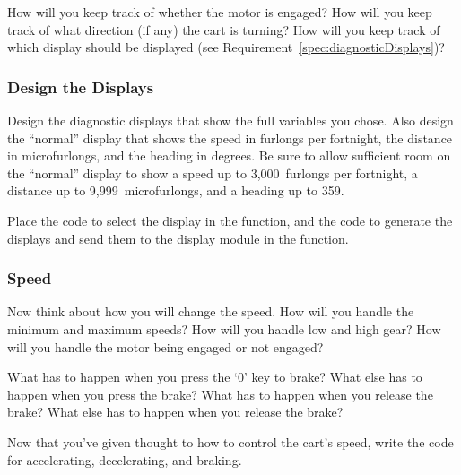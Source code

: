 How will you keep track of whether the motor is engaged?
How will you keep track of what direction (if any) the cart is turning?
How will you keep track of which display should be displayed (see Requirement~\ref{spec:diagnosticDisplays})?

\subsubsection{Design the Displays}

Design the diagnostic displays that show the full variables you chose.
Also design the ``normal'' display that shows the speed in furlongs per fortnight, the distance in microfurlongs, and the heading in degrees.
Be sure to allow sufficient room on the ``normal'' display to show a speed up to 3,000~furlongs per fortnight, a distance up to 9,999~microfurlongs, and a heading up to 359\textdegree.

Place the code to select the display in the  function, and the code to generate the displays and send them to the display module in the  function.

\subsubsection{Speed}

Now think about how you will change the speed.
How will you handle the minimum and maximum speeds?
How will you handle low and high gear?
How will you handle the motor being engaged or not engaged?

What has to happen when you press the `0' key to brake?
What else has to happen when you press the brake?
What has to happen when you release the brake?
What else has to happen when you release the brake?


Now that you've given thought to how to control the cart's speed, write the code for accelerating, decelerating, and braking.

